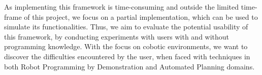 \noindent As implementing this framework is time-consuming and outside the limited time-frame of this project, we focus on a partial implementation, which can be used to simulate its functionalities.
Thus, we aim to evaluate the potential usability of this framework, by conducting experiments with users with and without programming knowledge.
With the focus on cobotic environments, we want to discover the difficulties encountered by the user, when faced with techniques in both Robot Programming by Demonstration and Automated Planning domains.
